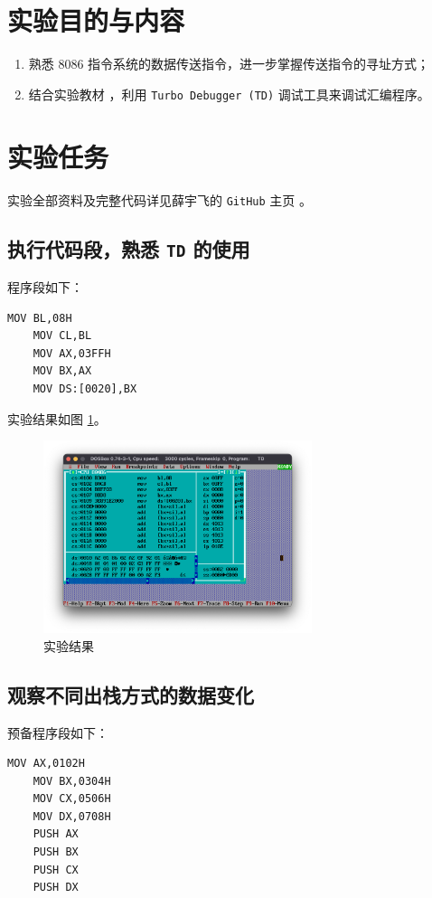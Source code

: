 \documentclass[11pt]{SEU-Digital-Report}
\begin{document}
\exptitlepage

\tableofcontents
\newpage

\section{实验目的与内容}       
\begin{enumerate}
    \item 熟悉 8086 指令系统的数据传送指令，进一步掌握传送指令的寻址方式；
    \item 结合实验教材 \cite{book,guide}，利用 \texttt{Turbo Debugger (TD)} 调试工具来调试汇编程序。   
\end{enumerate}

\section{实验任务}
实验全部资料及完整代码详见薛宇飞的 \texttt{GitHub} 主页 \cite{mygit}。

\subsection{执行代码段，熟悉 \texttt{TD} 的使用}
程序段如下：
\begin{lstlisting}[language={[x86masm]Assembler},title=code]
    MOV BL,08H
    MOV CL,BL
    MOV AX,03FFH
    MOV BX,AX
    MOV DS:[0020],BX
\end{lstlisting}

实验结果如图 \ref{fig:rlt2}。
\begin{figure}[htbp]
    \centering
    \includegraphics[width=0.7\textwidth]{fig/rlt1.png}
    \caption{实验结果}
    \label{fig:rlt2}
\end{figure}


\subsection{观察不同出栈方式的数据变化}
预备程序段如下：
\begin{lstlisting}[language={[x86masm]Assembler},title=pre-code]
    MOV AX,0102H
    MOV BX,0304H
    MOV CX,0506H
    MOV DX,0708H
    PUSH AX
    PUSH BX
    PUSH CX
    PUSH DX
\end{lstlisting}
\end{document}
